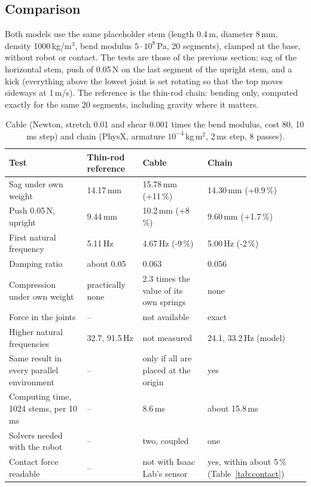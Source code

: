 \documentclass[11pt,a4paper]{article}
\begin{document}
\subsection{Comparison}

Both models use the same placeholder stem (length 0.4\,m, diameter 8\,mm, density 1000\,kg/m$^3$, bend modulus
$5\cdot10^{8}$\,Pa, 20 segments), clamped at the base, without robot or contact. The tests are those of the
previous section: sag of the horizontal stem, push of 0.05\,N on the last segment of the upright stem, and a
kick (everything above the lowest joint is set rotating so that the top moves sideways at 1\,m/s). The reference
is the thin-rod chain: bending only, computed exactly for the same 20 segments, including gravity where it
matters.

\begin{table}[h]
  \centering
  \caption{Cable (Newton, stretch 0.01 and shear 0.001 times the bend modulus, cost 80, 10\,ms step) and chain
           (PhysX, armature $10^{-4}$\,kg\,m$^2$, 2\,ms step, 8 passes).}
  \label{tab:model-comparison}
  \begin{tabular}{llll}
    \toprule
    Test & Thin-rod reference & Cable & Chain \\
    \midrule
    Sag under own weight      & 14.17\,mm   & 15.78\,mm (+11\,\%)    & 14.30\,mm (+0.9\,\%) \\
    Push 0.05\,N, upright     & 9.44\,mm    & 10.2\,mm (+8\,\%)      & 9.60\,mm (+1.7\,\%) \\
    First natural frequency   & 5.11\,Hz    & 4.67\,Hz (-9\,\%)      & 5.00\,Hz (-2\,\%) \\
    Damping ratio             & about 0.05  & 0.063                  & 0.056 \\
    Compression under own weight & practically none & 2.3 times the value of its own springs & none \\
    Force in the joints       & --          & not available          & exact \\
    Higher natural frequencies & 32.7, 91.5\,Hz & not measured        & 24.1, 33.2\,Hz (model) \\
    Same result in every parallel environment & -- & only if all are placed at the origin & yes \\
    Computing time, 1024 stems, per 10\,ms & -- & 8.6\,ms          & about 15.8\,ms \\
    Solvers needed with the robot & --      & two, coupled           & one \\
    Contact force readable    & --          & not with Isaac Lab's sensor & yes, within about 5\,\% (Table~\ref{tab:contact}) \\
    \bottomrule
  \end{tabular}
\end{table}
\end{document}

